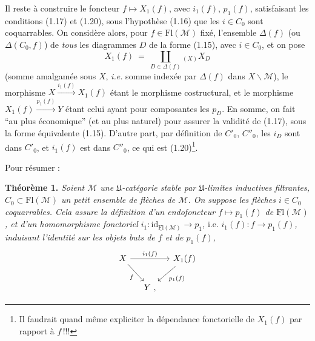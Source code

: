 \documentclass[11pt]{article}
\newcommand{\msp}[1]{\marginpar{\footnotesize [#1]}}
\newcommand{\cM}{\mathcal{M}}
\newcommand{\Flu}{\underline{\mathrm{Fl}}}
\newcommand{\Fl}{\mathrm{Fl}}
\newcommand{\fU}{\mathfrak{U}}
\begin{document}
Il reste à construire le foncteur $f \longmapsto X_1(f)$, avec $i_1(f)$, $p_1(f)$, satisfaisant les conditions (1.17) et (1.20), sous l'hypothèse (1.16) que les $i \in C_0$ sont coquarrables. On considère alors, pour $f \in \Fl(\cM)$ fixé, l'ensemble $\Delta(f)$ (ou $\Delta(C_0, f)$) de \textit{tous} les diagrammes $D$ de la forme (1.15), avec $i \in C_0$, et on pose
\[
X_1(f) \ = \ \coprod_{D \in \Delta(f)}{}_{(X)} X_D
\tag*{(1.23)}
\]
(somme amalgamée sous $X$, \textit{i.e.} somme indexée
\msp{page 10}
par $\Delta(f)$ dans $X\backslash\cM$), le morphisme $X \xrightarrow{i_1(f)} X_1(f)$ étant le morphisme costructural, et le morphisme $X_1(f) \xrightarrow{p_1(f)} Y$ étant celui ayant pour composantes les $p_D$. En somme, on fait “au plus économique” (et au plus naturel) pour assurer la validité de (1.17), sous la forme équivalente (1.15). D'autre part, par définition de $C'_0$, $C''_0$, les $i_D$ sont dans $C'_0$, et $i_1(f)$ est dans $C''_0$, ce qui est (1.20)\footnote{Il faudrait quand même expliciter la dépendance fonctorielle de $X_1(f)$ par rapport à $f$\,!!!}.

Pour résumer :

\textbf{Théorème 1.} \textit{Soient $\cM$ une $\fU$-catégorie stable par $\fU$-limites inductives filtrantes, $C_0 \subset \Fl(\cM)$ un petit ensemble de flèches de $\cM$. On suppose les flèches $i \in C_0$ coquarrables. Cela assure la définition d'un endofoncteur $f \longmapsto p_1(f)$ de $\Flu(\cM)$, et d'un homomorphisme fonctoriel $i_1 : \mathrm{id}_{\Flu(\cM)} \longrightarrow p_1$,} i.e. \textit{$i_1(f) : f \longrightarrow p_1(f)$, induisant l'identité sur les objets buts de $f$ et de $p_1(f)$,}
\[
\begin{tikzcd}[column sep=small]
X \arrow[rr, "i_1(f)"] \arrow[dr, "f"'] & & X_1(f) \arrow[dl, "p_1(f)"] \\
 & Y \ , &
\end{tikzcd}
\]
\end{document}
